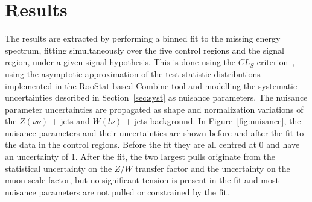 \section{Results}
\label{sec:results}

The results are extracted by performing a binned fit to the missing energy spectrum, fitting simultaneously over the five control regions and the signal region, under a given signal hypothesis. This is done using the $CL_S$ criterion~\cite{CLS1,CLS2}, using the asymptotic approximation of the test statistic distributions implemented in the RooStat-based Combine tool and modelling the systematic uncertainties described in Section~\ref{sec:syst} as nuisance parameters. The nuisance parameter uncertainties are propagated as shape and normalization variations of the $Z(\nu\nu)$ + jets and $W(l\nu)$ + jets background. In Figure~\ref{fig:nuisance}, the nuisance parameters and their uncertainties are shown before and after the fit to the data in the control regions. Before the fit they are all centred at 0 and have an uncertainty of 1. After the fit, the two largest pulls originate from the statistical uncertainty on the $Z/W$ transfer factor and the uncertainty on the muon scale factor, but no significant tension is present in the fit and most nuisance parameters are not pulled or constrained by the fit.

